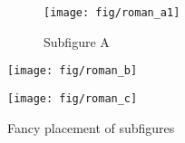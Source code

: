 \documentclass[12pt,a4paper]{article}
\begin{document}
\begin{figure}[t]\centering
\sbox{\leftpic}%
{%
 \begin{subfigure}[b]{0.45\linewidth}\centering
   \texttt{[image: fig/roman\_a1]}
   \caption{Subfigure A}\label{fig:2a}
 \end{subfigure}%
}
 \usebox{\leftpic}
 \quad %
 \begin{minipage}[b][\ht\leftpic][s]{0.45\linewidth}
  \begin{center}
   \texttt{[image: fig/roman\_b]}
   \label{fig:2b}
  \end{center}

  \vfill

  \begin{center}
   \texttt{[image: fig/roman\_c]}
   \label{fig:2c}
  \end{center}
 \end{minipage}
\caption{Fancy placement of subfigures}
\label{fig:2}
\end{figure}

\clearpage %
\end{document}
